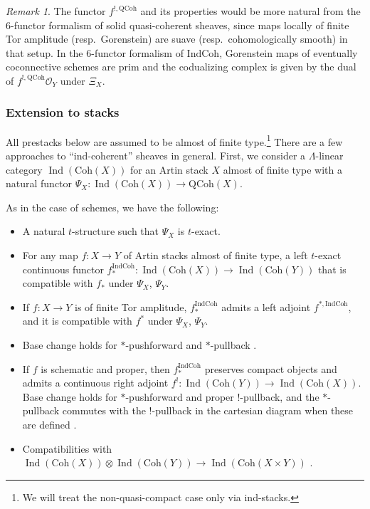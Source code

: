 \documentclass{amsart}
\theoremstyle{definition}
\theoremstyle{remark}
\newtheorem{remark}[theorem]{Remark}
\numberwithin{equation}{section}
\DeclareMathOperator{\Ind}{Ind}
\newcommand{\mc}{\mathcal}
\newcommand{\IndCoh}{\mathrm{IndCoh}}
\newcommand{\QCoh}{\mathrm{QCoh}}
\newcommand{\Coh}{\mathrm{Coh}}
\begin{document}
\begin{remark}
The functor $f^{!, \QCoh}$ and its properties would be more natural from the 6-functor formalism of solid quasi-coherent sheaves, since maps locally of finite Tor amplitude (resp.~Gorenstein) are suave (resp.~cohomologically smooth) in that setup. In the 6-functor formalism of $\IndCoh$, Gorenstein maps of eventually coconnective schemes are prim and the codualizing complex is given by the dual of $f^{!, \QCoh}\mc O_Y$ under $\Xi_X$. 
\end{remark}


\subsubsection{Extension to stacks}
All prestacks below are assumed to be almost of finite type.\footnote{We will treat the non-quasi-compact case only via ind-stacks.} There are a few approaches to ``ind-coherent'' sheaves in general. First, we consider a $\Lambda$-linear category $\Ind(\Coh(X))$ for an Artin stack $X$ almost of finite type with a natural functor $\Psi_X\colon \Ind(\Coh(X))\to \QCoh(X)$. 

As in the case of schemes, we have the following:
\begin{itemize}
    \item A natural $t$-structure such that $\Psi_X$ is $t$-exact. 
    \item For any map $f\colon X\to Y$ of Artin stacks almost of finite type, a left $t$-exact continuous functor $f_*^{\IndCoh}\colon \Ind(\Coh(X))\to \Ind(\Coh(Y))$ that is compatible with $f_*$ under $\Psi_X$, $\Psi_Y$. 
    \item If $f\colon X\to Y$ is of finite Tor amplitude, $f_*^{\IndCoh}$ admits a left adjoint $f^{*, \IndCoh}$, and it is compatible with $f^*$ under $\Psi_X$, $\Psi_Y$. 
    \item Base change holds for $*$-pushforward and $*$-pullback \cite[Lemma 9.26]{ZhuTame}. 
    \item If $f$ is schematic and proper, then $f_*^{\IndCoh}$ preserves compact objects and admits a continuous right adjoint $f^!\colon \Ind(\Coh(Y))\to \Ind(\Coh(X))$. Base change holds for $*$-pushforward and proper $!$-pullback, and the $*$-pullback commutes with the $!$-pullback in the cartesian diagram when these are defined \cite[Lemma 9.27]{ZhuTame}. 
    \item Compatibilities with $\Ind(\Coh(X))\otimes \Ind(\Coh(Y))\to \Ind(\Coh (X\times Y))$ \cite[Proposition 9.31]{ZhuTame}. 
\end{itemize}
\end{document}
